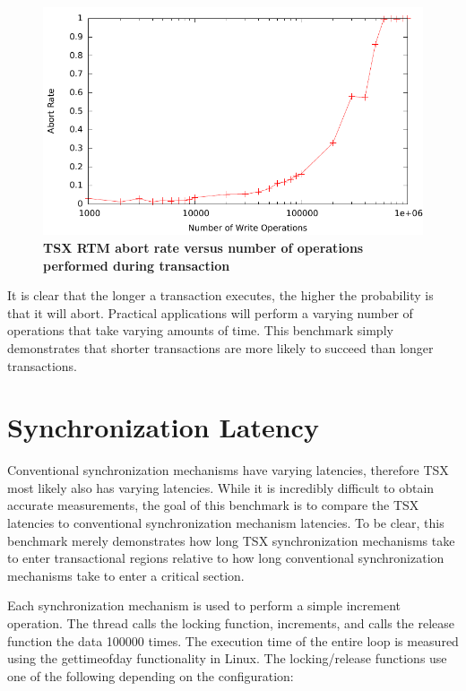 \documentclass[11pt]{book}
\begin{document}
\begin{figure}[H]
    \centering
    \graphicspath{ {./figures/} }
    \includegraphics[width=\textwidth,height=\textheight,keepaspectratio]{trxDuration}
    \caption{\textbf{TSX RTM abort rate versus number of operations performed
    during transaction}}
    \label{fig:trx_duration}
\end{figure}

It is clear that the longer a transaction executes, the higher the probability is that it
will abort.  Practical applications will perform a varying number of operations that take
varying amounts of time.  This benchmark simply demonstrates that shorter transactions are
more likely to succeed than longer transactions.

\section{Synchronization Latency}

Conventional synchronization mechanisms have varying latencies, therefore TSX most likely
also has varying latencies.  While it is incredibly difficult to obtain accurate
measurements, the goal of this benchmark is to compare the TSX latencies to conventional
synchronization mechanism latencies.  To be clear, this benchmark merely demonstrates how
long TSX synchronization mechanisms take to enter transactional regions relative to how
long conventional synchronization mechanisms take to enter a critical section.

Each synchronization mechanism is used to perform a simple increment operation.
The thread calls the locking function, increments, and calls the release
function the data 100000 times.  The execution time of the entire loop is
measured using the gettimeofday functionality in Linux.  The locking/release
functions use one of the following depending on the configuration: 
\end{document}
